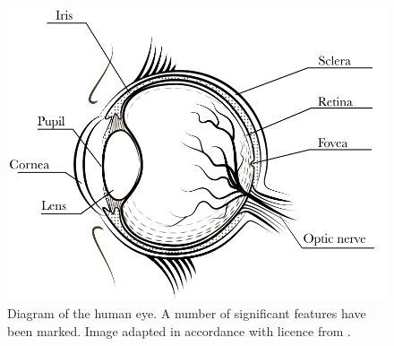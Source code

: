 
\begin{figure}
    \centering
    \includegraphics[width=0.8\linewidth]{figures/eye.pdf}
    \caption{Diagram of the human eye. A number of significant features have been marked. Image adapted in accordance with licence from \cite{freepik}.}
    \label{fig:anatomy}
\end{figure}







